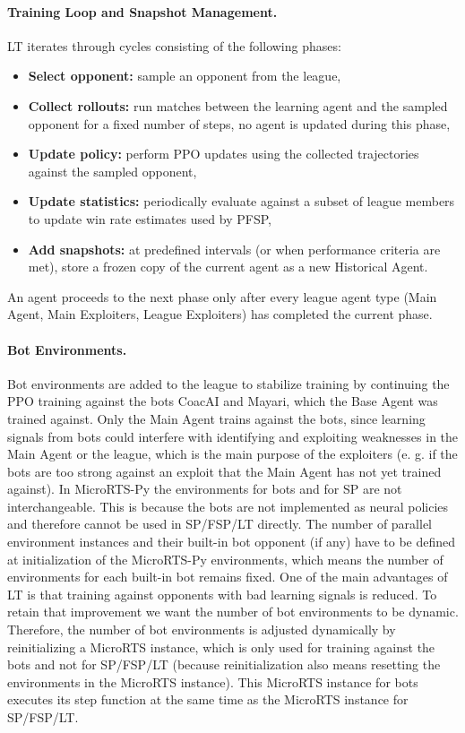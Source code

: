 \documentclass[10pt,twocolumn,letterpaper]{article}
\begin{document}
\paragraph{Training Loop and Snapshot Management.}
LT iterates through cycles consisting of the following phases:
\begin{itemize}
    \item \textbf{Select opponent:} sample an opponent from the league,
    \item \textbf{Collect rollouts:} run matches between the learning agent and the sampled opponent for a fixed number of steps, no agent is updated during this phase,
    \item \textbf{Update policy:} perform PPO updates using the collected trajectories against the sampled opponent,
    \item \textbf{Update statistics:} periodically evaluate against a subset of league members to update win rate estimates used by PFSP,
    \item \textbf{Add snapshots:} at predefined intervals (or when performance criteria are met), store a frozen copy of the current agent as a new Historical Agent.
\end{itemize}
An agent proceeds to the next phase only after every league agent type (Main Agent, Main Exploiters, League Exploiters) has completed the current phase.

\paragraph{Bot Environments.}
Bot environments are added to the league to stabilize training by continuing the PPO training against the bots CoacAI and Mayari, which the Base Agent was trained against.
Only the Main Agent trains against the bots, since learning signals from bots could interfere with identifying and exploiting weaknesses in the Main Agent or the league, which is the main purpose of the exploiters (e. g. if the bots are too strong against an exploit that the Main Agent has not yet trained against).
In MicroRTS-Py the environments for bots and for SP are not interchangeable.
This is because the bots are not implemented as neural policies and therefore cannot be used in SP/FSP/LT directly. 
The number of parallel environment instances and their built-in bot opponent (if any) have to be defined at initialization of the MicroRTS-Py environments, which means the number of environments for each built-in bot remains fixed.
One of the main advantages of LT is that training against opponents with bad learning signals is reduced.
To retain that improvement we want the number of bot environments to be dynamic.
Therefore, the number of bot environments is adjusted dynamically by reinitializing a MicroRTS instance, which is only used for training against the bots and not for SP/FSP/LT (because reinitialization also means resetting the environments in the MicroRTS instance).
This MicroRTS instance for bots executes its step function at the same time as the MicroRTS instance for SP/FSP/LT.
\end{document}
